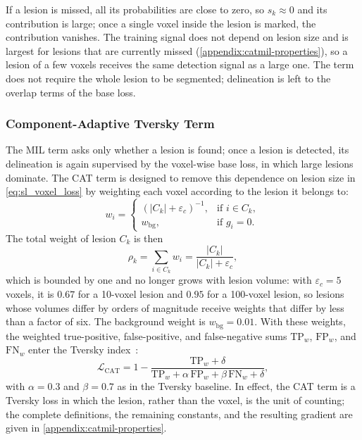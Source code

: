 If a lesion is missed, all its probabilities are close to zero, so
$s_k \approx 0$ and its contribution is large; once a single voxel inside
the lesion is marked, the contribution vanishes. The training signal does
not depend on lesion size and is largest for lesions that are currently
missed (\cref{appendix:catmil-properties}), so a lesion of a few voxels
receives the same detection signal as a large one. The term does not
require the whole lesion to be segmented; delineation is left to the
overlap terms of the base loss.

\subsubsection{Component-Adaptive Tversky Term}

The MIL term asks only whether a lesion is found; once a lesion is
detected, its delineation is again supervised by the voxel-wise base loss,
in which large lesions dominate. The CAT term is designed to remove this
dependence on lesion size in \cref{eq:sl_voxel_loss} by weighting each
voxel according to the lesion it belongs to:
\begin{equation}
w_i =
\begin{cases}
(|C_k| + \varepsilon_{c})^{-1}, & \text{if } i \in C_k, \\
w_{\mathrm{bg}}, & \text{if } g_i = 0 .
\end{cases}
\label{eq:sl_cat_weights}
\end{equation}
The total weight of lesion $C_k$ is then
\begin{equation}
\rho_k
=
\sum_{i \in C_k} w_i
=
\frac{|C_k|}{|C_k| + \varepsilon_{c}} ,
\label{eq:sl_cat_lesion_weight}
\end{equation}
which is bounded by one and no longer grows with lesion volume: with
$\varepsilon_{c}=5$ voxels, it is $0.67$ for a 10-voxel lesion and $0.95$
for a 100-voxel lesion, so lesions whose volumes differ by orders of
magnitude receive weights that differ by less than a factor of six. The
background weight is $w_{\mathrm{bg}}=0.01$. With these weights, the
weighted true-positive, false-positive, and false-negative sums
$\mathrm{TP}_{w}$, $\mathrm{FP}_{w}$, and $\mathrm{FN}_{w}$ enter the
Tversky index~\cite{salehi_tversky_2017}:
\begin{equation}
\mathcal{L}_{\mathrm{CAT}}
=
1 -
\frac{\mathrm{TP}_{w}+\delta}
{\mathrm{TP}_{w} + \alpha\, \mathrm{FP}_{w} + \beta\, \mathrm{FN}_{w} + \delta},
\label{eq:sl_cat_loss}
\end{equation}
with $\alpha=0.3$ and $\beta=0.7$ as in the Tversky baseline. In effect,
the CAT term is a Tversky loss in which the lesion, rather than the voxel,
is the unit of counting; the complete definitions, the remaining constants,
and the resulting gradient are given in \cref{appendix:catmil-properties}.

